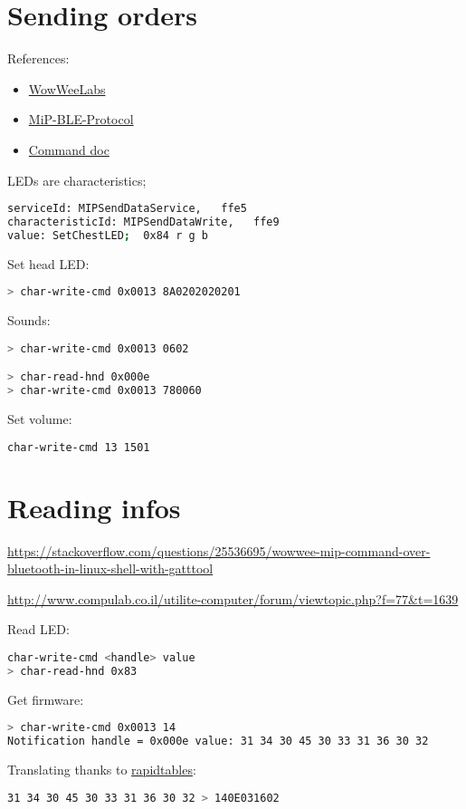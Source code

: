 \documentclass[a4paper,10pt]{article}
\newcommand{\link}[1] {\href{#1}{#1}}
\begin{document}
\section{Sending orders}
References:\begin{itemize}
 \item \href{https://github.com/WowWeeLabs}{WowWeeLabs}
 \item \href{https://github.com/WowWeeLabs/MiP-BLE-Protocol}{MiP-BLE-Protocol}
 \item \href{https://github.com/WowWeeLabs/MiP-BLE-Protocol/blob/master/MiP-Protocol.md}
     {Command doc}
\end{itemize}


LEDs are characteristics;
\begin{lstlisting}[language=bash]
serviceId: MIPSendDataService,   ffe5
characteristicId: MIPSendDataWrite,   ffe9
value: SetChestLED;  0x84 r g b
\end{lstlisting}

Set head LED:
\begin{lstlisting}[language=bash]
> char-write-cmd 0x0013 8A0202020201
\end{lstlisting}

Sounds:
\begin{lstlisting}[language=bash]
> char-write-cmd 0x0013 0602

> char-read-hnd 0x000e
> char-write-cmd 0x0013 780060
\end{lstlisting}

Set volume:
\begin{lstlisting}[language=bash]
char-write-cmd 13 1501
\end{lstlisting}


\section{Reading infos}
\link{https://stackoverflow.com/questions/25536695/wowwee-mip-command-over-bluetooth-in-linux-shell-with-gatttool}

\link{http://www.compulab.co.il/utilite-computer/forum/viewtopic.php?f=77\&t=1639}

Read LED:
\begin{lstlisting}[language=bash]
char-write-cmd <handle> value
> char-read-hnd 0x83
\end{lstlisting}

Get firmware:
\begin{lstlisting}[language=bash]
> char-write-cmd 0x0013 14
Notification handle = 0x000e value: 31 34 30 45 30 33 31 36 30 32
\end{lstlisting}
Translating thanks to 
\href{http://www.rapidtables.com/convert/number/hex-to-ascii.htm}{rapidtables}:
\begin{lstlisting}[language=bash]
31 34 30 45 30 33 31 36 30 32 > 140E031602
\end{lstlisting}
\end{document}

